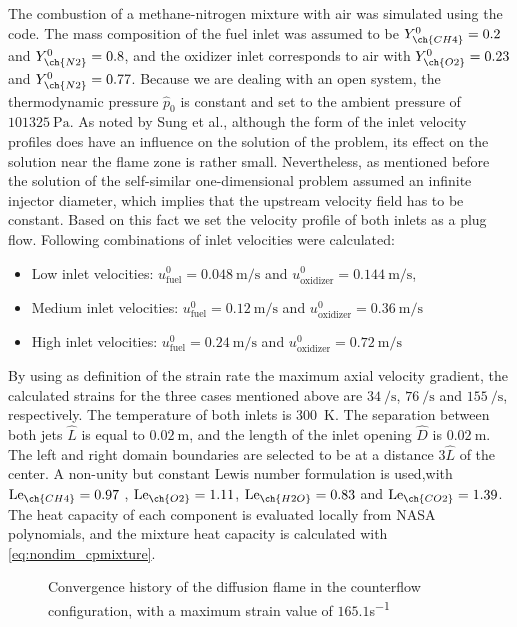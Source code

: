 The combustion of a methane-nitrogen mixture with air was simulated using the \BoSSS code. The mass composition of the fuel inlet was assumed to be  $Y^0_{\ch{CH4}} = 0.2$ and $Y^0_{\ch{N2}} = 0.8$, and the oxidizer inlet corresponds to air with   $Y^0_{\ch{O2}} = 0.23$ and $Y^0_{\ch{N2}} = 0.77$. Because we are dealing with an open system, the thermodynamic pressure $\hat p_0$ is constant and set to the ambient pressure of $\SI{101325}{\pascal}$. As noted by Sung et al., \cite{sungStructuralResponseCounterflow1995} although the form of the inlet velocity profiles does have an influence on the solution of the problem, its effect on the solution near the flame zone is rather small. Nevertheless, as mentioned before the solution of the self-similar one-dimensional problem assumed an infinite injector diameter, which implies that the upstream velocity field has to be constant. Based on this fact we set the velocity profile of both inlets as a plug flow. Following combinations of inlet velocities were calculated:
\begin{itemize}
	\item  Low inlet velocities:  $u^0_{\text{fuel}} = \SI{0.048}{\meter \per \second}$ and  $u^0_{\text{oxidizer}} = \SI{0.144}{\meter \per \second}$,
	\item Medium inlet velocities:  $u^0_{\text{fuel}} = \SI{0.12}{\meter \per \second}$ and  $u^0_{\text{oxidizer}} = \SI{0.36}{\meter \per \second}$
	\item High inlet velocities: $u^0_{\text{fuel}}  = \SI{0.24}{\meter \per \second}$ and   $u^0_{\text{oxidizer}} = \SI{0.72}{\meter \per \second}$
\end{itemize}
By using as definition of the strain rate the maximum axial velocity gradient, the calculated strains for the three cases mentioned above are $\SI{34}{\per\second}$, $\SI{76}{\per\second}$ and $\SI{155}{\per\second}$, respectively. The temperature of both inlets is \SI{300}{\kelvin}. The separation between both jets $\hat L$ is equal to $\SI{0.02}{\meter}$, and the length of the inlet opening $\hat D$ is $\SI{0.02}{\meter}$. The left and right domain boundaries are selected to be at a distance $3\hat L$ of the center. A non-unity but constant Lewis number formulation is used,with
$\Lewis_{\ch{CH4}} =  0.97 $ , $\Lewis_{\ch{O2}} = 1.11 $, $\Lewis_{\ch{H2O}} = 0.83 $ and $\Lewis_{\ch{CO2}} = 1.39 $.\cite{smookePremixedNonpremixedTest1991} The heat capacity of each component is evaluated locally from NASA polynomials, and the mixture heat capacity is calculated with \cref{eq:nondim_cpmixture}.
\begin{figure}[t!]
	\centering
	\caption{Convergence history of the diffusion flame in the counterflow configuration, with a maximum strain value of $165.1 $\si{s^{-1}}}
	\label{fig:CDF_ConvergenceStory}
\end{figure}

